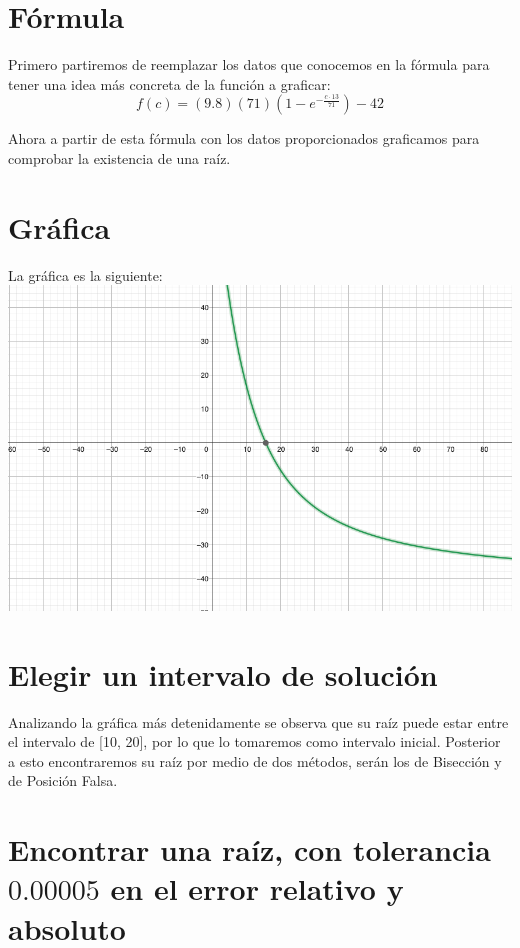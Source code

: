 \documentclass{article}
\begin{document}
\section{Fórmula}
Primero partiremos de reemplazar los datos que conocemos en la fórmula para tener una idea más concreta de la función a graficar:
\[f(c) = (9.8)(71)\left(1 - e^{-\frac{c \cdot 13}{71}}\right) - 42\]

Ahora a partir de esta fórmula con los datos proporcionados graficamos para comprobar la existencia de una raíz.

\section{Gráfica}
La gráfica es la siguiente:
\\
\includegraphics[scale=0.5]{Grafica.png}

\section{Elegir un intervalo de solución}
Analizando la gráfica más detenidamente se observa que su raíz puede estar entre el intervalo de [10, 20], por lo que lo tomaremos como intervalo inicial. Posterior a esto encontraremos su raíz por medio de dos métodos, serán los de Bisección y de Posición Falsa.

\section{Encontrar una raíz, con tolerancia \(0.00005\) en el error relativo y absoluto}
\end{document}
